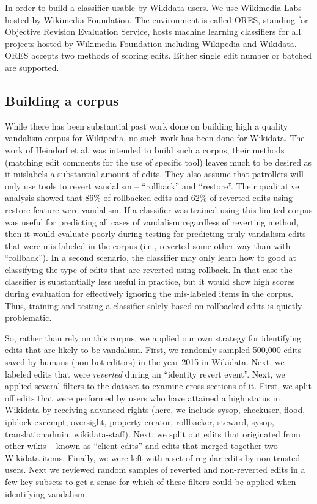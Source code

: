 \documentclass{sig-alternate}
\begin{document}
In order to build a classifier usable by Wikidata users. We use Wikimedia Labs hosted by Wikimedia Foundation. The environment is called ORES, standing for Objective Revision Evaluation Service, hosts machine learning classifiers for all projects hosted by Wikimedia Foundation including Wikipedia and Wikidata. ORES accepts two methods of scoring edits. Either single edit number or batched are supported.
\subsection{Building a corpus}
While there has been substantial past work done on building high a quality vandalism corpus for Wikipedia\cite{potthast:crowdsourcing}, no such work has been done for Wikidata. The work of Heindorf et al.\cite{heindorf:towards} was intended to build such a corpus, their methods (matching edit comments for the use of specific tool) leaves much to be desired as it mislabels a substantial amount of edits.  They also assume that patrollers will only use tools to revert vandalism -- ``rollback'' and ``restore''. Their qualitative analysis showed that 86\% of rollbacked edits and 62\% of reverted edits using restore feature were vandalism.  If a classifier was trained using this limited corpus was useful for predicting all cases of vandalism regardless of reverting method, then it would evaluate poorly during testing for predicting truly vandalism edits that were mis-labeled in the corpus (i.e., reverted some other way than with ``rollback'').  In a second scenario, the classifier may only learn how to good at classifying the type of edits that are reverted using rollback. In that case the classifier is substantially less useful in practice, but it would show high scores during evaluation for effectively ignoring the mis-labeled items in the corpus. Thus, training and testing a classifier solely based on rollbacked edits is quietly problematic.

So, rather than rely on this corpus, we applied our own strategy for identifying edits that are likely to be vandalism. First, we randomly sampled 500,000 edits saved by humans (non-bot editors) in the year 2015 in Wikidata. Next, we labeled edits that were \textit{reverted} during an ``identity revert event''. Next, we applied several filters to the dataset to examine cross sections of it. First, we split off edits that were performed by users who have attained a high status in Wikidata by receiving advanced rights (here, we include sysop, checkuser, flood, ipblock-excempt, oversight, property-creator, rollbacker, steward, sysop, translationadmin, wikidata-staff).  Next, we split out edits that originated from other wikis -- known as ``client edits'' and edits that merged together two Wikidata items. Finally, we were left with a set of regular edits by non-trusted users.  Next we reviewed random samples of reverted and non-reverted edits in a few key subsets to get a sense for which of these filters could be applied when identifying vandalism.
\end{document}
